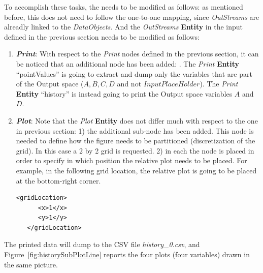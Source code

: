 To accomplish these tasks, the  needs to be modified as follows:
\nb as mentioned before, this  does not need to follow the one-to-one mapping, since \textit{OutStreams}
are alreadly linked to the \textit{DataObjects}.
And the \textit{OutStreams} \textbf{Entity} in the input defined in the previous section needs to be modified as
follows:

\begin{enumerate}
   \item \textbf{\textit{Print}}:
   With respect to the \textit{Print} nodes defined in the previous section, it can
   be noticed that an additional node has been added: . The \textit{Print} \textbf{Entity}
   ``pointValues'' is going to extract and dump only the variables that are part of the Output space
   ($A,B,C,D$ and not $InputPlaceHolder$).  The \textit{Print} \textbf{Entity} ``history'' is instead going to print
   the Output space variables $A$ and $D$.

   \item \textbf{\textit{Plot}}:
 Note that the  \textit{Plot} \textbf{Entity} does not differ much with respect to the one in
 previous section: 1) the additional sub-node   has been added.
 This node is needed to define how the figure needs to be partitioned (discretization of the grid). In this case
 a 2 by 2 grid is requested. 2) in each  the node  is placed in
 order to specify in which position the relative plot needs to be placed. For example, in the following grid
 location, the relative plot is going to be placed at the bottom-right corner.
 \begin{lstlisting}[style=XML,morekeywords={arg,extension,pauseAtEnd,overwrite}]
   <gridLocation>
      <x>1</x>
      <y>1</y>
   </gridLocation>
  \end{lstlisting}
\end{enumerate}

The printed data will dump to the CSV file \textit{history\_0.csv}, and Figure~\ref{fig:historySubPlotLine} reports the four plots (four variables) drawn in the same picture.

